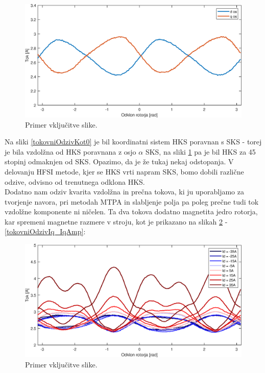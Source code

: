 \documentclass[a4paper,twoside,openright,12pt,slovene]{book}
\begin{document}
\begin{figure}[!htbp]
    \centering
    \includegraphics[width=1\columnwidth]{Slike/tokovniOdzivKot45.eps}
    \caption{\label{tokovniOdzivKot45} Primer vključitve slike.}
\end{figure}

Na sliki \ref{tokovniOdzivKot0} je bil koordinatni sistem HKS poravnan s SKS - torej je bila vzdolžna od HKS poravnana z osjo $\alpha$ SKS, na sliki \ref{tokovniOdzivKot45} pa je bil HKS za 45 stopinj
odmaknjen od SKS. Opazimo, da je že tukaj nekaj odstopanja. V delovanju HFSI metode, kjer se HKS vrti napram SKS, bomo dobili različne odzive, odvisno od trenutnega odklona HKS. 
\\
Dodatno nam odziv kvarita vzdolžna in prečna tokova, ki ju uporabljamo za tvorjenje navora, pri metodah MTPA in slabljenje polja pa poleg prečne tudi tok vzdolžne komponente ni ničelen. Ta dva tokova
dodatno magnetita jedro rotorja, kar spremeni magnetne razmere v stroju, kot je prikazano na slikah \ref{tokovniOdzivId} - \ref{tokovniOdzivIq_IqAmp}:

\begin{figure}[!htbp]
    \centering
    \includegraphics[width=1\columnwidth]{Slike/tokovniOdzivId.eps}
    \caption{\label{tokovniOdzivId} Primer vključitve slike.}
\end{figure}
\end{document}
